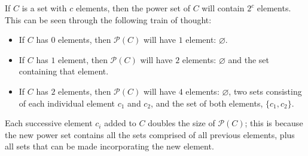 If $ C $ is a set with $ c $ elements, then the power set of $ C $ will contain $ 2^c $ elements. This can be seen through the following train of thought:
\begin{itemize}
	\item If $ C $ has $ 0 $ elements, then $ \mathcal{P}(C) $ will have $ 1 $ element: $\varnothing$.
	\item If $ C $ has $ 1 $ element, then $ \mathcal{P}(C) $ will have $ 2 $ elements: $\varnothing$ and the set containing that element.
	\item If $ C $ has $ 2 $ elements, then $ \mathcal{P}(C) $ will have $ 4 $ elements: $\varnothing$, two sets consisting of each individual element $c_1$ and $c_2$, and the set of both elements, $\{c_1,c_2\}$.
\end{itemize}

Each successive element $c_i$ added to $ C $ doubles the size of $\mathcal{P}(C)$; this is because the new power set contains all the sets comprised of all previous elements, plus all sets that can be made incorporating the new element.